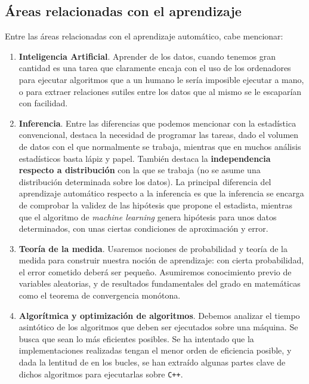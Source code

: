  \subsection{Áreas relacionadas con el aprendizaje}
 Entre las áreas relacionadas con el aprendizaje automático, cabe mencionar:

 \begin{enumerate}[i]
  \item \textbf{Inteligencia Artificial}. Aprender de los datos, cuando tenemos gran cantidad es una tarea que 
  claramente encaja con el uso de los ordenadores para ejecutar algoritmos que a un humano le sería imposible ejecutar a mano, o para
  extraer relaciones sutiles entre los datos que al mismo se le escaparían con facilidad.
  
  \item \textbf{Inferencia}. Entre las diferencias que podemos mencionar con la estadística convencional, destaca 
  la necesidad de programar las tareas, dado el volumen de datos con el que normalmente se trabaja, mientras que en muchos análisis 
  estadísticos basta lápiz y papel. También destaca la \textbf{independencia respecto a distribución} con la que se trabaja (no se
  asume una distribución determinada sobre los datos). La principal diferencia del aprendizaje automático respecto a la inferencia 
  es que la inferencia se encarga de comprobar la validez de las hipótesis que propone el estadista, mientras que el algoritmo de
  \textit{machine learning} genera hipótesis para unos datos determinados, con unas ciertas condiciones de aproximación y error.
 
  \item \textbf{Teoría de la medida}. Usaremos nociones de probabilidad y teoría de la medida para construir nuestra noción de 
  aprendizaje: con cierta probabilidad, el error cometido deberá ser pequeño. Asumiremos conocimiento previo de variables 
  aleatorias, y de resultados fundamentales del grado en matemáticas como el teorema de convergencia monótona.
  
  \item \textbf{Algorítmica y optimización de algoritmos}. Debemos analizar el tiempo asintótico de los algoritmos que deben ser ejecutados
  sobre una máquina. Se busca que sean lo más eficientes posibles. Se ha intentado que la implementaciones realizadas 
  tengan el menor orden de eficiencia posible, y dada la lentitud de \R en los bucles, se han extraído algunas partes clave de dichos 
  algoritmos para ejecutarlas sobre \texttt{C++}.
 \end{enumerate}
 
